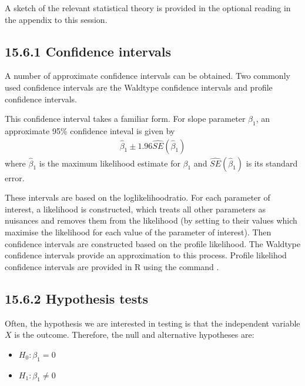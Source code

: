 \documentclass[letterpaper,10pt,english]{jupyterBook}
\begin{document}
\sphinxAtStartPar
A sketch of the relevant statistical theory is provided in the optional reading in the appendix to this session.


\subsection{15.6.1 Confidence intervals}
\label{\detokenize{15.g. Logistic Regression:confidence-intervals}}
\sphinxAtStartPar
A number of approximate confidence intervals can be obtained. Two commonly used confidence intervals are the Wald\sphinxhyphen{}type confidence intervals and profile confidence intervals.

\sphinxAtStartPar
{} This confidence interval takes a familiar form. For slope parameter \(\beta_1\), an approximate 95\% confidence inteval is given by
\begin{equation*}
\begin{split}
\hat{\beta}_1 \pm 1.96 \hat{SE}(\hat{\beta}_1)
\end{split}
\end{equation*}
\sphinxAtStartPar
where \(\hat{\beta}_1\) is the maximum likelihood estimate for \(\beta_1\) and \(\hat{SE}(\hat{\beta}_1)\) is its standard error.

\sphinxAtStartPar
{}  These intervals are based on the log\sphinxhyphen{}likelihood\sphinxhyphen{}ratio. For each parameter of interest, a  likelihood is constructed, which treats all other parameters as nuisances and removes them from the likelihood (by setting to their values which maximise the likelihood for each value of the parameter of interest). Then confidence intervals are constructed based on the profile likelihood. The Wald\sphinxhyphen{}type confidence intervals provide an approximation to this process. Profile likelihod confidence intervals are provided in R using the command .


\subsection{15.6.2 Hypothesis tests}
\label{\detokenize{15.g. Logistic Regression:hypothesis-tests}}
\sphinxAtStartPar
Often, the  hypothesis we are interested in testing is that the independent variable \(X\) is  the outcome. Therefore, the null and alternative hypotheses are:
\begin{itemize}
\item {} 
\sphinxAtStartPar
\(H_0: \beta_1 = 0\)

\item {} 
\sphinxAtStartPar
\(H_1: \beta_1 \neq 0\)

\end{itemize}
\end{document}
